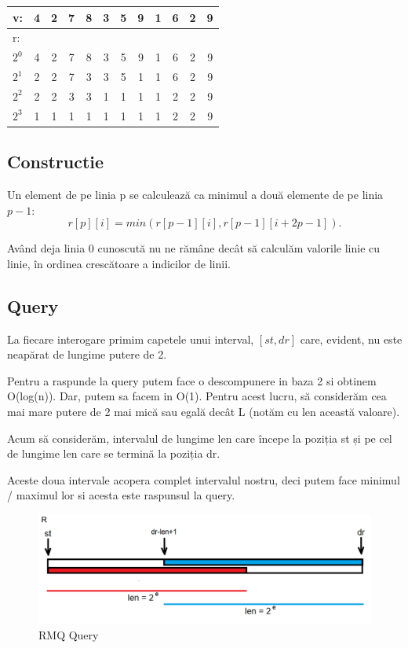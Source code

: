 \documentclass[11pt,a4paper]{article}
\theoremstyle{definition}
\theoremstyle{plain}
\theoremstyle{remark}
\begin{document}
\bigskip
\begin{tabular}{|l|c|c|c|c|c|c|c|c|c|c|c|}
\hline
v: & 4 & 2 & 7 & 8 & 3 & 5 & 9 & 1 & 6 & 2 & 9 \\
\hline
r: & & & & & & & & & & & \\
\hline
$2^0$ & 4 & 2 & 7 & 8 & 3 & 5 & 9 & 1 & 6 & 2 & 9 \\
\hline
$2^1$ & 2 & 2 & 7 & 3 & 3 & 5 & 1 & 1 & 6 & 2 & 9 \\
\hline
$2^2$ & 2 & 2 & 3 & 3 & 1 & 1 & 1 & 1 & 2 & 2 & 9 \\
\hline
$2^3$ & 1 & 1 & 1 & 1 & 1 & 1 & 1 & 1 & 2 & 2 & 9 \\
\hline
\end{tabular}
\bigskip

\subsection*{Constructie}
Un element de pe linia p se calculează ca minimul a două elemente de pe linia $p-1$:
$$r[p][i] = min (r[p-1][i], r[p-1][i+2
p-1]).$$

Având deja linia 0 cunoscută nu ne rămâne decât să calculăm valorile linie cu linie, în ordinea crescătoare a indicilor de linii.

\subsection*{Query}
La fiecare interogare primim capetele unui interval, $[st, dr]$ care, evident, nu este neapărat de lungime putere de 2.

Pentru a raspunde la query putem face o descompunere in baza 2 si obtinem O(log(n)). Dar, putem sa facem in O(1).
Pentru acest lucru, să considerăm cea mai mare putere de 2 mai mică sau egală decât L (notăm cu len această valoare).

Acum să considerăm, intervalul de lungime len care începe la poziția st și pe cel de lungime len care se termină la poziția dr.

Aceste doua intervale acopera complet intervalul nostru, deci putem face minimul / maximul lor si acesta este raspunsul la query.

\begin{figure}[H]
    \centering
    \includegraphics[width=0.75\linewidth]{rmq.png}
    \caption{RMQ Query}
    \label{fig:enter-label}
\end{figure}
\end{document}

